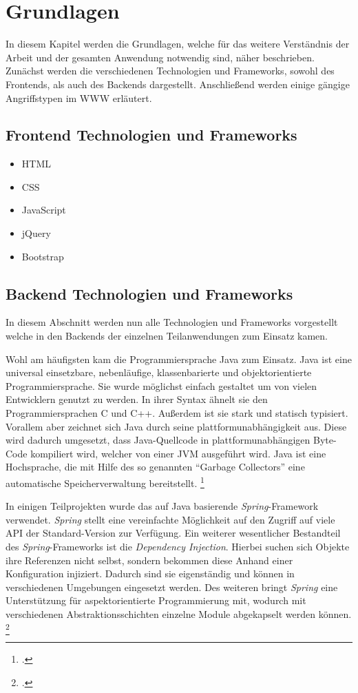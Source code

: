 \chapter{Grundlagen}

In diesem Kapitel werden die Grundlagen, welche für das weitere Verständnis der Arbeit und der gesamten Anwendung notwendig sind, näher beschrieben. Zunächst werden die verschiedenen Technologien und Frameworks, sowohl des Frontends, als auch des Backends dargestellt. Anschließend werden einige gängige Angriffstypen im \ac{WWW} erläutert.

\section{Frontend Technologien und Frameworks}

\begin{itemize}
    \item \ac{HTML}
    \item \ac{CSS}
    \item JavaScript
    \item jQuery
    \item Bootstrap
\end{itemize}

\section{Backend Technologien und Frameworks}

In diesem Abschnitt werden nun alle Technologien und Frameworks vorgestellt welche in den Backends der einzelnen Teilanwendungen zum Einsatz kamen.

Wohl am häufigsten kam die Programmiersprache Java zum Einsatz. Java ist eine universal einsetzbare, nebenläufige, klassenbarierte und objektorientierte Programmiersprache. Sie wurde möglichst einfach gestaltet um von vielen Entwicklern genutzt zu werden. In ihrer Syntax ähnelt sie den Programmiersprachen C und C++. Außerdem ist sie stark und statisch typisiert. Vorallem aber zeichnet sich Java durch seine plattformunabhängigkeit aus. Diese wird dadurch umgesetzt, dass Java-Quellcode in plattformunabhängigen Byte-Code kompiliert wird, welcher von einer \ac{JVM} ausgeführt wird. Java ist eine Hochsprache, die mit Hilfe des so genannten \enquote{Garbage Collectors} eine automatische Speicherverwaltung bereitstellt. \footcite[Vgl.][1]{javaspecification}

In einigen Teilprojekten wurde das auf Java basierende \textit{Spring}-Framework verwendet. \textit{Spring} stellt eine vereinfachte Möglichkeit auf den Zugriff auf viele \ac{API} der Standard-Version zur Verfügung. Ein weiterer wesentlicher Bestandteil des \textit{Spring}-Frameworks ist die \textit{Dependency Injection}. Hierbei suchen sich Objekte ihre Referenzen nicht selbst, sondern bekommen diese Anhand einer Konfiguration injiziert. Dadurch sind sie eigenständig und können in verschiedenen Umgebungen eingesetzt werden. Des weiteren bringt \textit{Spring} eine Unterstützung für aspektorientierte Programmierung mit, wodurch mit verschiedenen Abstraktionsschichten einzelne Module abgekapselt werden können. \footcite[Vgl.][2]{spring3}

